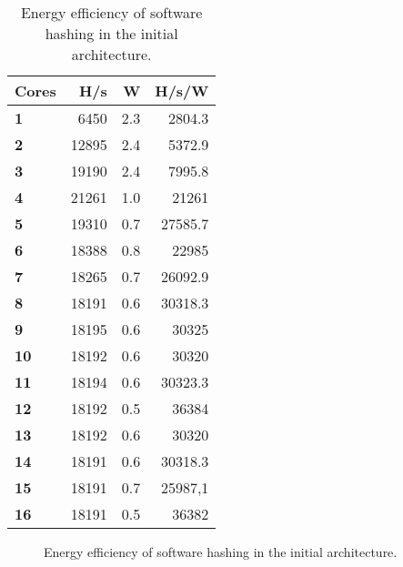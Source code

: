 \begin{appendix}
\begin{table}
\centering
\begin{tabular}{| l | r | r || r |}
  \hline 
  \textbf{Cores} & \textbf{H/s} & \textbf{W} & \textbf{H/s/W} \\
  \hline                       
  \textbf{1} &  6450 & 2.3 & 2804.3\\
  \textbf{2} &  12895 & 2.4 & 5372.9\\
  \textbf{3} &  19190 & 2.4 & 7995.8\\
  \textbf{4} &  21261 & 1.0 & 21261\\
  \textbf{5} &  19310 & 0.7 & 27585.7\\
  \textbf{6} &  18388 & 0.8 & 22985\\
  \textbf{7} &  18265 & 0.7 & 26092.9\\
  \textbf{8} &  18191 & 0.6 & 30318.3\\
  \textbf{9} &  18195 & 0.6 & 30325\\
  \textbf{10} &  18192 & 0.6 & 30320\\
  \textbf{11} &  18194 & 0.6 & 30323.3\\
  \textbf{12} &  18192 & 0.5 & 36384\\
  \textbf{13} &  18192 & 0.6 & 30320\\
  \textbf{14} &  18191 & 0.6 & 30318.3\\
  \textbf{15} &  18191 & 0.7 & 25987,1\\
  \textbf{16} &  18191 & 0.5 & 36382\\
  \hline 
\end{tabular}
\caption{Energy efficiency of software hashing in the initial architecture.}
\label{tab:SW-eff1}
\end{table}

\begin{figure}
\centering
	\caption{Energy efficiency of software hashing in the initial architecture.}
	\label{fig:SW-eff1}
\end{figure}


\end{appendix}
